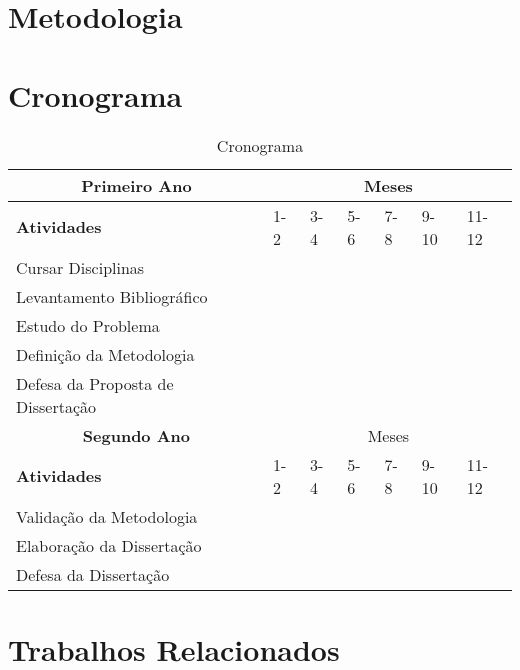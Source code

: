 \documentclass[12pt]{article}
\begin{document}
\section{Metodologia} \label{sec:Metod}

\section{Cronograma} \label{sec:Crono}

\begin{longtable}[c]{|l|l|l|l|l|l|l|}
\caption{Cronograma} \label{my-label}\\ \hline
\endfirsthead
\endhead
\multicolumn{1}{|c|}{\textbf{Primeiro Ano}} & \multicolumn{6}{c|}{\cellcolor[HTML]{ECF4FF}Meses} \\ \hline
\rowcolor[HTML]{ECF4FF} 
\textbf{Atividades} & 1-2 & 3-4 & 5-6 & 7-8 & 9-10 & 11-12 \\ \hline
Cursar Disciplinas & \cellcolor[HTML]{C0C0C0} & \cellcolor[HTML]{C0C0C0} & \cellcolor[HTML]{C0C0C0} & \cellcolor[HTML]{C0C0C0} & \cellcolor[HTML]{C0C0C0} & \cellcolor[HTML]{C0C0C0} \\ \hline
Levantamento Bibliográfico & \cellcolor[HTML]{C0C0C0} & & & & & \\ \hline
Estudo do Problema & & \cellcolor[HTML]{C0C0C0} & \cellcolor[HTML]{C0C0C0} & & & \\ \hline
Definição da Metodologia & & & & \cellcolor[HTML]{C0C0C0} & \cellcolor[HTML]{C0C0C0} & \\ \hline
Defesa da Proposta de Dissertação & & & & & \cellcolor[HTML]{C0C0C0} \\ \hline
\multicolumn{1}{|c|}{\textbf{Segundo Ano}}  & \multicolumn{6}{c|}{\cellcolor[HTML]{ECF4FF}Meses} \\ \hline \rowcolor[HTML]{ECF4FF} 
\textbf{Atividades} & 1-2 & 3-4 & 5-6 & 7-8 & 9-10 & 11-12 \\ \hline
Validação da Metodologia & \cellcolor[HTML]{C0C0C0} & \cellcolor[HTML]{C0C0C0} & \cellcolor[HTML]{C0C0C0} & & & \\ \hline
Elaboração da Dissertação & & & \cellcolor[HTML]{C0C0C0} & \cellcolor[HTML]{C0C0C0} & \cellcolor[HTML]{C0C0C0} & \\ \hline
Defesa da Dissertação & & & & & & \cellcolor[HTML]{C0C0C0} \\ \hline
\end{longtable}

\section{Trabalhos Relacionados} \label{sec:trab-rel}
\end{document}
